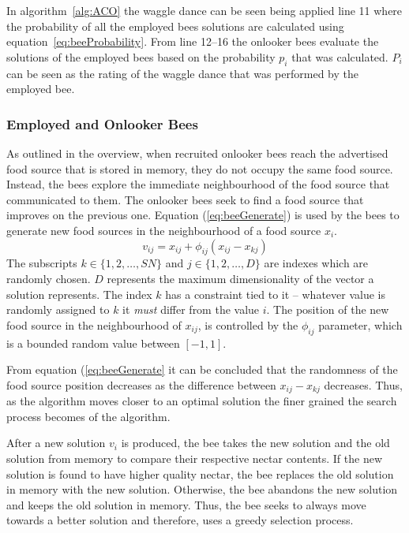 In algorithm~\ref{alg:ACO} the waggle dance can be seen being applied line 11 where the probability of all the employed bees solutions are calculated using equation~\ref{eq:beeProbability}. From line 12--16 the onlooker bees evaluate the solutions of the employed bees based on the probability $p_i$ that was calculated. $P_i$ can be seen as the rating of the waggle dance that was performed by the employed bee.

\subsubsection{Employed and Onlooker Bees}
\label{sec:employonlookerbees}
As outlined in the overview, when recruited onlooker bees reach the advertised food source that is stored in memory, they do not occupy the same food source\cite{ABCCompareStudy,ABCNumericalOptimization}. Instead, the bees explore the immediate neighbourhood of the food source that communicated to them\cite{BeeJobShop,ABCFusionGrid,ABCReconfigDistro}. The onlooker bees seek to find a food source that improves on the previous one\cite{BeeJobShop,ABCCompareStudy,ABCLeafConstrained,ABCNumericalOptimization}. Equation (\ref{eq:beeGenerate}) is used by the bees to generate new food sources in the neighbourhood of a food source $x_i$\cite{BeeJobShop,ABCCompareStudy,ABCFusionGrid}.
\begin{equation}
\label{eq:beeGenerate}
v_{ij} = x_{ij} + \phi_{ij}(x_{ij} - x_{kj})
\end{equation}
The subscripts $k \in \{1,2,\dots,SN\}$ and $j \in \{1,2,\dots,D\}$ are indexes which are randomly chosen. $D$ represents the maximum dimensionality of the vector a solution represents. The index $k$ has a constraint tied to it -- whatever value is randomly assigned to $k$ it \emph{must} differ from the value $i$. The position of the new food source in the neighbourhood of $x_{ij}$, is controlled by the $\phi_{ij}$ parameter, which is a bounded random value between $[-1,1]$. 

From equation (\ref{eq:beeGenerate} it can be concluded that the randomness of the food source position decreases as the difference between $x_{ij} - x_{kj}$ decreases. Thus, as the algorithm moves closer to an optimal solution the finer grained the search process becomes of the algorithm\cite{ABCCompareStudy,ABCNumericalOptimization,ABCImageEnhancement}.

After a new solution $v_i$ is produced, the bee takes the new solution and the old solution from memory to compare their respective nectar contents. If the new solution is found to have higher quality nectar, the bee replaces the old solution in memory with the new solution\cite{ABCCompareStudy,BeeJobShop,ABCImageEnhancement,ABCReconfigDistro}. Otherwise, the bee abandons the new solution and keeps the old solution in memory\cite{ABCCompareStudy,ABCLeafConstrained,ABCNumericalOptimization,}. Thus, the bee seeks to always move towards a better solution and therefore, uses a greedy selection process\cite{ABCCompareStudy,ABCLeafConstrained,ABCReconfigDistro}.

